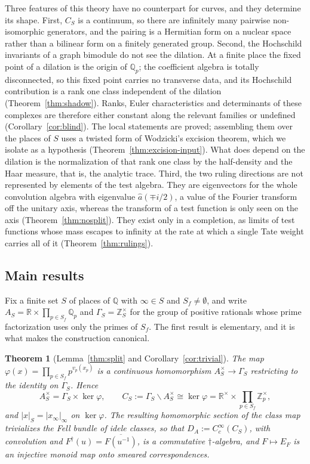 \documentclass[11pt]{amsart}
\newtheorem{theorem}{Theorem}[section]
\theoremstyle{definition}
\theoremstyle{remark}
\newcommand{\R}{\mathbb R}
\newcommand{\Z}{\mathbb Z}
\newcommand{\Q}{\mathbb Q}
\begin{document}
Three features of this theory have no counterpart for curves, and they
determine its shape.  First, $C_S$ is a continuum, so there are infinitely
many pairwise non-isomorphic generators, and the pairing is a Hermitian form
on a nuclear space rather than a bilinear form on a finitely generated group.
Second, the Hochschild invariants of a graph bimodule do not see the
dilation.  At a finite place the fixed point of a dilation is the origin of
$\Q_p$; the coefficient algebra is totally disconnected, so this fixed point
carries no transverse data, and its Hochschild contribution is a rank one
class independent of the dilation (Theorem~\ref{thm:shadow}).  Ranks, Euler
characteristics and determinants of these complexes are therefore either
constant along the relevant families or undefined
(Corollary~\ref{cor:blind}).  The local statements are proved; assembling them
over the places of $S$ uses a twisted form of Wodzicki's excision theorem,
which we isolate as a hypothesis (Theorem~\ref{thm:excision-input}).  What does depend on the dilation is the
normalization of that rank one class by the half-density and the Haar
measure, that is, the analytic trace.  Third, the two ruling directions are
not represented by elements of the test algebra.  They are eigenvectors for
the whole convolution algebra with eigenvalue $\widehat a(\mp i/2)$, a value
of the Fourier transform off the unitary axis, whereas the transform of a
test function is only seen on the axis (Theorem~\ref{thm:nosplit}).  They
exist only in a completion, as limits of test functions whose mass escapes to
infinity at the rate at which a single Tate weight carries all of it
(Theorem~\ref{thm:rulings}).

\subsection*{Main results}

Fix a finite set $S$ of places of $\Q$ with $\infty\in S$ and $S_f\ne
\emptyset$, and write $A_S=\R\times\prod_{p\in S_f}\Q_p$ and
$\Gamma_S=\Z_S^{\times}$ for the group of positive rationals whose prime
factorization uses only the primes of $S_f$.  The first result is elementary,
and it is what makes the construction canonical.

\begin{theorem}[Lemma~\ref{thm:split} and
Corollary~\ref{cor:trivial}]\label{thm:introA}
The map $\varphi(x)=\prod_{p\in S_f}p^{v_p(x_p)}$ is a continuous
homomorphism $A_S^{\times}\to\Gamma_S$ restricting to the identity on
$\Gamma_S$.  Hence
\[
A_S^{\times}=\Gamma_S\times\ker\varphi,\qquad
C_S:=\Gamma_S\backslash A_S^{\times}\cong\ker\varphi=
\R^{\times}\times\prod_{p\in S_f}\Z_p^{\times},
\]
and $|x|_S=|x_{\infty}|_{\infty}$ on $\ker\varphi$.  The resulting
homomorphic section of the class map trivializes the Fell bundle of idele
classes, so that $D_A:=C_c^{\infty}(C_S)$, with convolution and
$F^{\dagger}(u)=\overline{F(u^{-1})}$, is a commutative $\dagger$-algebra,
and $F\mapsto E_F$ is an injective monoid map onto smeared correspondences.
\end{theorem}
\end{document}
